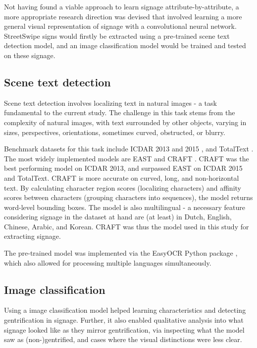 Not having found a viable approach to learn signage attribute-by-attribute, a more appropriate research direction was devised that involved learning a more general visual representation of signage with a convolutional neural network. StreetSwipe signs would firstly be extracted using a pre-trained scene text detection model, and an image classification model would be trained and tested on these signage.

\subsection{Scene text detection}
Scene text detection involves localizing text in natural images - a task fundamental to the current study. The challenge in this task stems from the complexity of natural images, with text surrounded by other objects, varying in sizes, perspectives, orientations, sometimes curved, obstructed, or blurry.

Benchmark datasets for this task include ICDAR 2013 \cite{icdar13} and 2015 \cite{icdar15}, and TotalText \cite{totaltext}. The most widely implemented models are EAST \cite{zhou_east_2017} and CRAFT \cite{baek_character_2019}. CRAFT was the best performing model on ICDAR 2013, and surpassed EAST on ICDAR 2015 and TotalText. CRAFT is more accurate on curved, long, and non-horizontal text. By calculating character region scores (localizing characters) and affinity scores between characters (grouping characters into sequences), the model returns word-level bounding boxes. The model is also multilingual - a necessary feature considering signage in the dataset at hand are (at least) in Dutch, English, Chinese, Arabic, and Korean. CRAFT was thus the model used in this study for extracting signage.

The pre-trained model was implemented via the EasyOCR Python package \cite{noauthor_jaided_nodate}, which also allowed for processing multiple languages simultaneously.

\subsection{Image classification}

Using a image classification model helped learning characteristics and detecting gentrification in signage. Further, it also enabled qualitative analysis into what signage looked like as they mirror gentrification, via inspecting what the model saw as (non-)gentrified, and cases where the visual distinctions were less clear.

